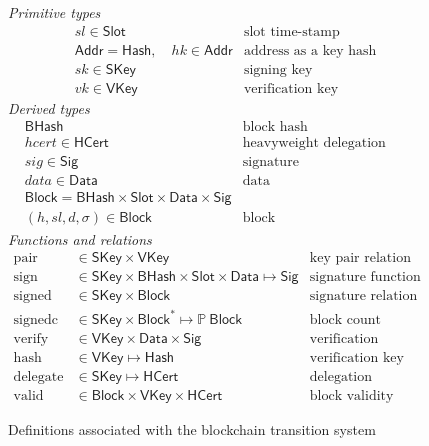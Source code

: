 \documentclass[11pt,a4paper]{article}
\newcommand{\powerset}[1]{\mathbb{P}~#1}
\newcommand{\type}[1]{\mathsf{#1}}
\newcommand{\seqof}[1]{#1^{*}}
\newcommand{\Hash}{\type{Hash}}    %
\newcommand{\BHash}{\type{BHash}}  %
\newcommand{\Addr}{\type{Addr}}
\newcommand{\Slot}{\type{Slot}}
\newcommand{\Block}{\type{Block}}
\newcommand{\HCert}{\type{HCert}}
\newcommand{\SKey}{\type{SKey}}
\newcommand{\VKey}{\type{VKey}}
\newcommand{\Sig}{\type{Sig}}
\newcommand{\Data}{\type{Data}}
\newcommand{\hashname}{hash}
\newcommand{\signname}{sign}
\newcommand{\signedname}{signed}
\newcommand{\signedseqname}{signedc}
\newcommand{\verifyname}{verify}
\newcommand{\delegatename}{delegate}
\newcommand{\validname}{valid}
\newcommand{\keypairname}{pair}
\begin{document}
\begin{figure}[h]
  \emph{Primitive types}
  \begin{align*}
    & sl \in \Slot & \text{slot time-stamp}\\
    & \Addr = \Hash,\quad hk \in \Addr & \text{address as a key hash}\\
    & sk \in \SKey & \text{signing key}\\
    & vk \in \VKey & \text{verification key}
  \end{align*}
  \emph{Derived types}
  \begin{align*}
    & \BHash & \text{block hash}\\
    & hcert \in \HCert & \text{heavyweight delegation certificate}\\
    & sig \in \Sig  & \text{signature}\\
    & data \in \Data  & \text{data}\\
    & \Block = \BHash \times \Slot \times \Data \times \Sig & \\
    & (h, sl, d, \sigma) \in \Block
      & \text{block}
  \end{align*}
  \emph{Functions and relations}
  \begin{align*}
    \text{\keypairname} & \in \SKey \times \VKey & \text{key pair relation}\\
    \text{\signname} & \in \SKey \times \BHash \times \Slot \times \Data \mapsto \Sig
      & \text{signature function}\\
    \text{\signedname} & \in \SKey \times \Block & \text{signature relation}\\
    \text{\signedseqname} & \in \SKey \times \seqof{\Block} \mapsto \powerset{\Block}
      & \text{block count function}\\
    \text{\verifyname} & \in \VKey \times \Data \times \Sig
      & \text{verification relation}\\
    \text{\hashname} & \in \VKey \mapsto \Hash
      & \text{verification key hash function}\\
    \text{\delegatename} & \in \SKey \mapsto \HCert
      & \text{delegation function}\\
    \text{\validname} & \in \Block \times \VKey \times \HCert
      & \text{block validity relation}
  \end{align*}
  \caption{Definitions associated with the blockchain transition system}
  \label{fig:state-trans-abstract}
\end{figure}
\end{document}
